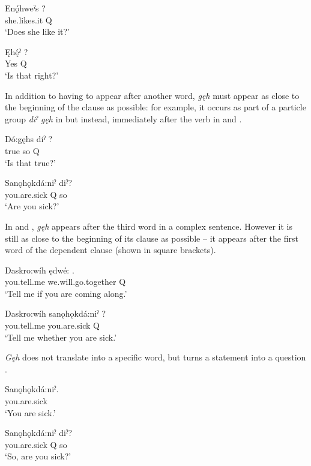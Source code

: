 \ea\label{ex:tagquesex4}
\gll Enǫ́hweˀs ? \\
she.likes.it Q\\
\glt ‘Does she like it?’ 
\z

\ea\label{ex:tagquesex400}
\gll Ęhę́ˀ ? \\
Yes Q\\
\glt ‘Is that right?’ 
\z

In addition to having to appear after another word, \textit{gęh} must appear as close to the beginning of the clause as possible: for example, it occurs as part of a particle group \textit{diˀ gęh} in  but instead, immediately after the verb in  and .

\ea\label{ex:tagquesex7}
\gll Dó:gęhs diˀ ? \\
true so Q\\
\glt ‘Is that true?’
\z

\ea\label{ex:tagquesex700}
\gll Sanǫhǫkdá:niˀ  diˀ? \\
you.are.sick Q so \\
\glt ‘Are you sick?’ 
\z

In  and , \textit{gęh} appears after the third word in a complex sentence. However it is still as close to the beginning of its clause as possible -- it appears after the first word of the dependent clause (shown in square brackets).

\ea\label{ex:tagquesex6}
\gll Daskro:wíh ędwé: . \\
you.tell.me we.will.go.together Q\\
\glt ‘Tell me if you are coming along.’
\z


\ea\label{ex:tagquesex600}
\gll Daskro:wíh sanǫhǫkdá:niˀ ? \\
you.tell.me you.are.sick Q\\
\glt ‘Tell me whether you are sick.’
\z

\textit{Gęh} does not translate into a specific word, but turns a statement  into a question .

\ea\label{ex:tagquesex301}
\gll Sanǫhǫkdá:niˀ.\\
you.are.sick\\
\glt ‘You are sick.’ 
\z

\ea\label{ex:tagquesex300}
\gll Sanǫhǫkdá:niˀ  diˀ? \\
you.are.sick Q so\\
\glt ‘So, are you sick?’ 
\z

